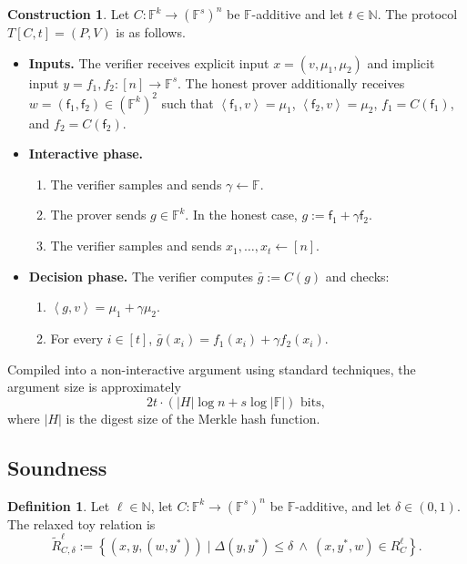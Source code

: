 \documentclass[11pt]{article}
\theoremstyle{plain}
\theoremstyle{definition}
\newtheorem{definition}[theorem]{Definition}
\newtheorem{construction}[theorem]{Construction}
\newcommand{\F}{\mathbb{F}}
\newcommand{\N}{\mathbb{N}}
\newcommand{\set}[1]{\left\{#1\right\}}
\newcommand{\angles}[1]{\left\langle #1\right\rangle}
\newcommand{\abs}[1]{\left|#1\right|}
\begin{document}
\begin{construction}
Let $C:\F^k\to(\F^s)^n$ be $\F$-additive and let $t\in\N$. The protocol $T[C,t]=(P,V)$ is as follows.
\begin{itemize}
  \item \textbf{Inputs.} The verifier receives explicit input $x=(v,\mu_1,\mu_2)$ and implicit input $y=f_1,f_2:[n]\to\F^s$. The honest prover additionally receives $w=(\mathsf{f}_1,\mathsf{f}_2)\in(\F^k)^2$ such that $\angles{\mathsf{f}_1,v}=\mu_1$, $\angles{\mathsf{f}_2,v}=\mu_2$, $f_1=C(\mathsf{f}_1)$, and $f_2=C(\mathsf{f}_2)$.
  \item \textbf{Interactive phase.}
  \begin{enumerate}
    \item The verifier samples and sends $\gamma\leftarrow\F$.
    \item The prover sends $g\in\F^k$. In the honest case, $g:=\mathsf{f}_1+\gamma\mathsf{f}_2$.
    \item The verifier samples and sends $x_1,\ldots,x_t\leftarrow[n]$.
  \end{enumerate}
  \item \textbf{Decision phase.} The verifier computes $\bar g:=C(g)$ and checks:
  \begin{enumerate}
    \item $\angles{g,v}=\mu_1+\gamma\mu_2$.
    \item For every $i\in[t]$, $\bar g(x_i)=f_1(x_i)+\gamma f_2(x_i)$.
  \end{enumerate}
\end{itemize}
\end{construction}

Compiled into a non-interactive argument using standard techniques, the argument size is approximately
\[
  2t\cdot(\abs{H}\log n+s\log\abs{\F})\text{ bits},
\]
where $\abs{H}$ is the digest size of the Merkle hash function.

\subsection{Soundness}

\begin{definition}
Let $\ell\in\N$, let $C:\F^k\to(\F^s)^n$ be $\F$-additive, and let $\delta\in(0,1)$. The relaxed toy relation is
\[
\widetilde R_{C,\delta}^\ell
:=\set{(x,y,(w,y^*))\mid \Delta(y,y^*)\le\delta\ \wedge\ (x,y^*,w)\in R_C^\ell}.
\]
\end{definition}
\end{document}
